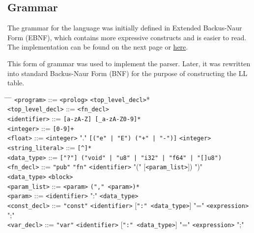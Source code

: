 \documentclass[12pt,a4paper]{article}
\begin{document}
\subsection{Grammar \cite{grammar}}
The grammar for the language was initially defined in Extended Backus-Naur Form (EBNF), which contains more expressive constructs and is easier to read. The implementation can be found on the next page or 
\href{https://github.com/rm-a0/ifj-compiler/blob/main/doc/grammar\_edited.go}{here}.

This form of grammar was used to implement the parser. Later, it was rewritten into standard Backus-Naur Form (BNF) for the purpose of constructing the LL table.

\newpage

\begin{tabbing}
\hspace{-1cm} \= \hspace{4cm} \= \hspace{1cm} \= \kill
\> \texttt{<program>} \> ::= \> \texttt{<prolog>} \mid \texttt{<top\_level\_decl>}* \\
\> \texttt{<top\_level\_decl>} \> ::= \> \texttt{<fn\_decl>} \\
\> \texttt{<identifier>} \> ::= \> \texttt{[a-zA-Z] [_a-zA-Z0-9]*} \\
\> \texttt{<integer>} \> ::= \> \texttt{[0-9]+} \\
\> \texttt{<float>} \> ::= \> \texttt{<integer>} "." \texttt{[("e" | "E") ("+" | "-")]} \texttt{<integer>} \\
\> \texttt{<string\_literal>} \> ::= \> \texttt{[^]*} \\
\> \texttt{<data\_type>} \> ::= \> \texttt{["?"] ("void" | "u8" | "i32" | "f64" | "[]u8")} \\
\> \texttt{<fn\_decl>} \> ::= \> \texttt{"pub"} \texttt{"fn"} \texttt{<identifier>} "(" [\texttt{<param\_list>}]) ")" \\
\> \> \texttt{<data\_type>} \texttt{<block>} \\
\> \texttt{<param\_list>} \> ::= \> \texttt{<param>} \texttt{("," <param>)*} \\
\> \texttt{<param>} \> ::= \> \texttt{<identifier>} ":" \texttt{<data\_type>} \\
\> \texttt{<const\_decl>} \> ::= \> \texttt{"const"} \texttt{<identifier>} [\texttt{":" <data\_type>}] "=" \texttt{<expression>} ";" \\
\> \texttt{<var\_decl>} \> ::= \> \texttt{"var"} \texttt{<identifier>} [\texttt{":" <data\_type>}] "=" \texttt{<expression>} ";" \\

\end{tabbing}
\end{document}
